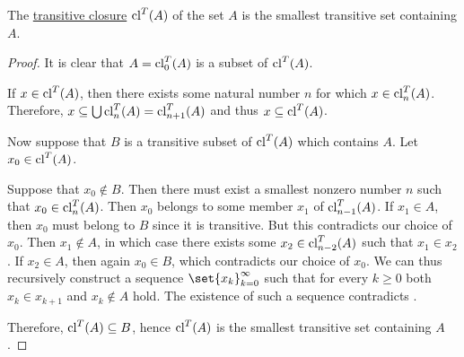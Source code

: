 \begin{proposition}\label{thm:transitive_closure_of_a_set}
  The \hyperref[def:transitive_closure_of_a_set]{transitive closure} \( \operatorname{cl}^T(A) \) of the set \( A \) is the smallest transitive set containing \( A \).
\end{proposition}
\begin{proof}
  It is clear that \( A = \operatorname{cl}_0^T(A) \) is a subset of \( \operatorname{cl}^T(A) \).

  If \( x \in \operatorname{cl}^T(A) \), then there exists some natural number \( n \) for which \( x \in \operatorname{cl}_n^T(A) \). Therefore, \( x \subseteq \bigcup \operatorname{cl}_n^T(A) = \operatorname{cl}_{n+1}^T(A) \) and thus \( x \subseteq \operatorname{cl}^T(A) \).

  Now suppose that \( B \) is a transitive subset of \( \operatorname{cl}^T(A) \) which contains \( A \). Let \( x_0 \in \operatorname{cl}^T(A) \).

  Suppose that \( x_0 \not\in B \). Then there must exist a smallest nonzero number \( n \) such that \( x_0 \in \operatorname{cl}_n^T(A) \). Then \( x_0 \) belongs to some member \( x_1 \) of \( \operatorname{cl}_{n-1}^T(A) \). If \( x_1 \in A \), then \( x_0 \) must belong to \( B \) since it is transitive. But this contradicts our choice of \( x_0 \). Then \( x_1 \not\in A \), in which case there exists some \( x_2 \in \operatorname{cl}_{n-2}^T(A) \) such that \( x_1 \in x_2 \). If \( x_2 \in A \), then again \( x_0 \in B \), which contradicts our choice of \( x_0 \). We can thus recursively construct a sequence \( \set{ x_k }_{k=0}^\infty \) such that for every \( k \geq 0 \) both \( x_k \in x_{k+1} \) and \( x_k \not\in A \) hold. The existence of such a sequence contradicts .

  Therefore, \( \operatorname{cl}^T(A) \subseteq B \), hence \( \operatorname{cl}^T(A) \) is the smallest transitive set containing \( A \).
\end{proof}

